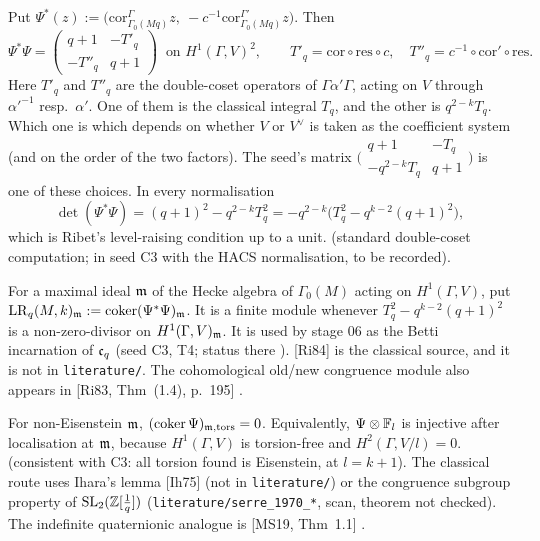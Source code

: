 \begin{proposition}[$\Psi^*\Psi$]\label{prop:s03-PsiPsi}
Put $\Psi^*(z):=\big(\mathrm{cor}^\Gamma_{\Gamma_0(Mq)}z,\ -c^{-1}\mathrm{cor}^{\Gamma'}_{\Gamma_0(Mq)}z\big)$. Then
\[\Psi^*\Psi=\begin{pmatrix}q+1&-T'_q\\-T''_q&q+1\end{pmatrix}\ \text{ on }H^1(\Gamma,V)^2,\qquad
T'_q=\mathrm{cor}\circ\mathrm{res}\circ c,\quad T''_q=c^{-1}\circ\mathrm{cor}'\circ\mathrm{res}.\]
Here $T'_q$ and $T''_q$ are the double-coset operators of $\Gamma\alpha'\Gamma$, acting on $V$ through $\alpha'^{-1}$ resp.\ $\alpha'$.
One of them is the classical integral $T_q$, and the other is $q^{2-k}T_q$. Which one is which depends on whether $V$ or $V^\vee$
is taken as the coefficient system (and on the order of the two factors). The seed's matrix
$\big(\begin{smallmatrix}q+1&-T_q\\-q^{2-k}T_q&q+1\end{smallmatrix}\big)$ is one of these choices. In every normalisation
\[\det(\Psi^*\Psi)=(q+1)^2-q^{2-k}T_q^2=-q^{2-k}\big(T_q^2-q^{k-2}(q+1)^2\big),\]
which is Ribet's level-raising condition up to a unit. \sttoprove{} (standard double-coset computation; \stcomp{} in seed C3 with
the HACS normalisation, to be recorded).
\end{proposition}

\begin{definition}\label{def:s03-LR}
For a maximal ideal $\mathfrak{m}$ of the Hecke algebra of $\Gamma_0(M)$ acting on $H^1(\Gamma,V)$, put
$\mathrm{LR}_q(M,k)_{\mathfrak{m}}:=\operatorname{coker}(\Psi^*\Psi)_{\mathfrak{m}}$. It is a finite module whenever $T_q^2-q^{k-2}(q+1)^2$ is a non-zero-divisor on
$H^1(\Gamma,V)_{\mathfrak{m}}$.  It is used by stage 06 as the Betti incarnation of $\mathfrak{c}_q$ (seed C3, T4; status there
\stsketch). [Ri84] is the classical source, and it is not in \texttt{literature/}. The cohomological old/new congruence module
also appears in [Ri83, Thm~(1.4), p.~195]
 \stcited.
\end{definition}

\begin{conjecture}\label{conj:s03-iharaGL2}
For non-Eisenstein $\mathfrak{m}$, $(\operatorname{coker}\Psi)_{\mathfrak{m},\mathrm{tors}}=0$. Equivalently, $\Psi\otimes\mathbb{F}_l$ is injective after localisation at
$\mathfrak{m}$, because $H^1(\Gamma,V)$ is torsion-free and $H^2(\Gamma,V/l)=0$. \stexp{} (consistent with C3: all torsion found is
Eisenstein, at $l=k+1$). The classical route uses Ihara's lemma [Ih75] (not in \texttt{literature/}) or the congruence subgroup
property of $\mathrm{SL}_2(\mathbb{Z}[\frac1q])$ (\texttt{literature/serre\_1970\_*}, scan, theorem not checked). The indefinite quaternionic analogue
is [MS19, Thm~1.1]
 \stcited.
\end{conjecture}

